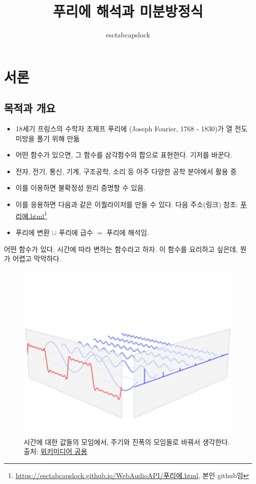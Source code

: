 \documentclass[article, oneside]{oblivoir}
\title{푸리에 해석과 미분방정식}
\author{esctabcapslock}
\begin{document}
\maketitle

\section{서론}
\subsection{목적과 개요}

\begin{itemize}
    \item 18세기 프링스의 수학자 조제프 푸리에 (Joseph Fourier, 1768 - 1830)가 열 전도 미방을  풀기 위해 만듦
    \item 어떤 함수가 있으면, 그 함수를 삼각함수의 합으로 표현한다. 기저를 바꾼다.
    \item 전자, 전기, 통신, 기계, 구조공학, 소리 등 아주 다양한 공학 분야에서 활용 중
    \item 이를 이용하면 불확정성 원리 증명할 수 있음.
    \item 이를 응용하면 다음과 같은 이퀄라이저를 만들 수 있다. 다음 주소(링크) 참조: \href{https://esctabcapslock.github.io/WebAudioAPI/푸리에.html}{푸리에.html}\footnote{\href{https://esctabcapslock.github.io/WebAudioAPI/푸리에.html}{https://esctabcapslock.github.io/WebAudioAPI/푸리에.html}, 본인 github임}
    \item 푸리에 변환 $\cup$ 푸리에 급수 $=$ 푸리에 해석임.
\end{itemize}
어떤 함수가 있다. 시간에 따라 변하는 함수라고 하자. 이 함수를 요리하고 싶은데, 뭔가 어렵고 막막하다.

\begin{figure}[ht]
    \centering
    \includegraphics[width=.4\textwidth]{./img/3.png}
    \caption{시간에 대한 값들의 모임에서, 주기와 진폭의 모임들로 바꿔서 생각한다. 출처: \href{https://en.wikipedia.org/wiki/File:Fourier_transform_time_and_frequency_domains_(small).gif}{위키미디어 공용}}
    \label{fig:my_label}
\end{figure}
\end{document}
